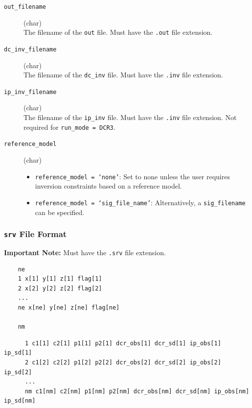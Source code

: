 \documentclass[a4paper,12pt]{article}
\begin{document}
\begin{description}
    \item[\texttt{out\_filename}] (char)\hfill \\
    The filename of the \texttt{out} file. Must have the \texttt{.out} file extension.

    \item[\texttt{dc\_inv\_filename}] (char)\hfill \\
    The filename of the \texttt{dc\_inv} file. Must have the \texttt{.inv} file extension.

    \item[\texttt{ip\_inv\_filename}] (char)\hfill \\
    The filename of the \texttt{ip\_inv} file. Must have the \texttt{.inv} file extension. Not required for \texttt{run\_mode = DCR3}.

    \item[\texttt{reference\_model}] (char)\hfill \\
    \begin{itemize}
        \item \texttt{reference\_model = `none'}: Set to none unless the user requires inversion constraints based on a reference model.
        \item \texttt{reference\_model = `sig\_file\_name'}: Alternatively, a \texttt{sig\_filename} can be specified.
    \end{itemize}
\end{description}




\newpage
\subsubsection{\texttt{srv} File Format} \label{forward_srv}

\begin{framed}
\noindent \textbf{Important Note:} Must have the \texttt{.srv} file extension.
\end{framed}

\begin{framed}
\begin{verbatim}
    ne
    1 x[1] y[1] z[1] flag[1]
    2 x[2] y[2] z[2] flag[2]
    ...
    ne x[ne] y[ne] z[ne] flag[ne]

    nm
\end{verbatim}

\begingroup
\scriptsize
\begin{verbatim}
      1 c1[1] c2[1] p1[1] p2[1] dcr_obs[1] dcr_sd[1] ip_obs[1] ip_sd[1]
      2 c1[2] c2[2] p1[2] p2[2] dcr_obs[2] dcr_sd[2] ip_obs[2] ip_sd[2]
      ...
      nm c1[nm] c2[nm] p1[nm] p2[nm] dcr_obs[nm] dcr_sd[nm] ip_obs[nm] ip_sd[nm]
\end{verbatim}
\endgroup
\end{framed}
\end{document}
